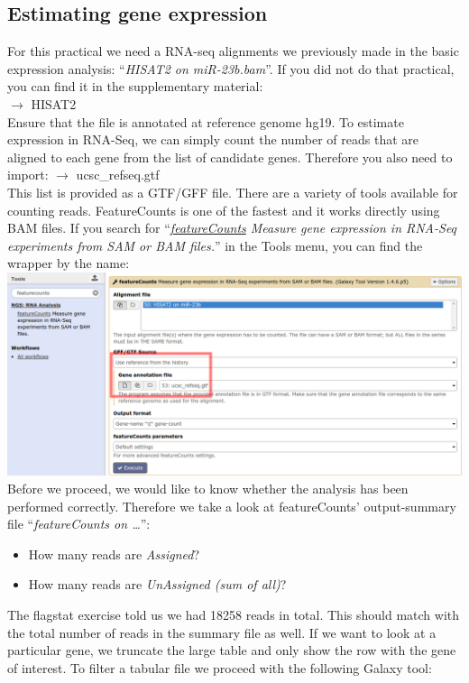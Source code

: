\documentclass[11pt,a4paper]{article}
\begin{document}
\subsection{Estimating gene expression}
For this practical we need a RNA-seq alignments we previously made in the basic expression analysis: ``\textit{HISAT2 on miR-23b.bam}''. If you did not do that practical, you can find it in the supplementary material: \\
\datalibrarydirrnaseqadvanced $\rightarrow$ HISAT2\\
Ensure that the file is annotated at reference genome hg19. To estimate expression in RNA-Seq, we can simply count the number of reads that are aligned to each gene from the list of candidate genes. Therefore you also need to import:
\datalibrarydirrnaseqtuxedo $\rightarrow$ ucsc\_refseq.gtf\\
This list is provided as a GTF/GFF file. There are a variety of tools available for counting reads. FeatureCounts is one of the fastest and it works directly using BAM files. If you search for
``\textit{\underline{featureCounts} Measure gene expression in RNA-Seq experiments from SAM or BAM files.}'' in the Tools menu, you can find the wrapper by the name:\\
\includegraphics[width=\textwidth]{figures/expression_01.png}\\
Before we proceed, we would like to know whether the analysis has been performed correctly. Therefore we take a look at featureCounts’ output-summary file ``\textit{featureCounts on \ldots}'':
\begin{itemize}
	\item How many reads are \textit{Assigned}?
	\item How many reads are \textit{UnAssigned (sum of all)}?
\end{itemize}
The flagstat exercise told us we had 18258 reads in total. This should match with the total number of reads in the summary file as well. If we want to look at a particular gene, we truncate the large table and only show the row with the gene of interest. To filter a tabular file we proceed with the following Galaxy tool: 
\end{document}
